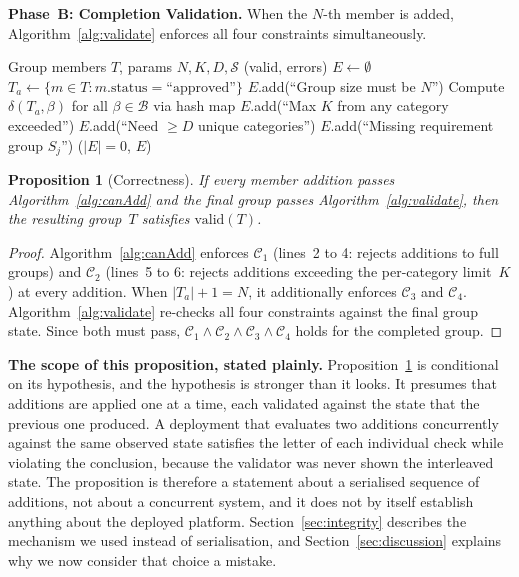 \documentclass[11pt,a4paper]{article}
\theoremstyle{plain}
\newtheorem{proposition}[theorem]{Proposition}
\theoremstyle{definition}
\theoremstyle{remark}
\begin{document}
\textbf{Phase~B: Completion Validation.} When the $N$-th member is added, Algorithm~\ref{alg:validate} enforces all four constraints simultaneously.

\begin{algorithm}[htbp]
\caption{Full Group Composition Validation (\texttt{validateComposition})}
\label{alg:validate}
\small
\begin{algorithmic}[1]
\REQUIRE Group members $T$, params $N, K, D, \mathcal{S}$
\ENSURE (valid, errors)
\STATE $E \gets \emptyset$
\STATE $T_a \gets \{m \in T : m.\text{status} = \text{``approved''}\}$
    \STATE $E$.add(``Group size must be $N$'')
\ENDIF
\STATE Compute $\delta(T_a, \beta)$ for all $\beta \in \mathcal{B}$ via hash map
    \STATE $E$.add(``Max $K$ from any category exceeded'')
\ENDIF
{}
    \STATE $E$.add(``Need $\geq D$ unique categories'')
\ENDIF
{}
        \STATE $E$.add(``Missing requirement group $S_j$'')
    \ENDIF
\ENDFOR
\RETURN ($|E| = 0$, $E$)
\end{algorithmic}
\end{algorithm}

\begin{proposition}[Correctness]
\label{prop:correctness}
If every member addition passes Algorithm~\ref{alg:canAdd} and the final group passes Algorithm~\ref{alg:validate}, then the resulting group~$T$ satisfies $\text{valid}(T)$.
\end{proposition}

\begin{proof}
Algorithm~\ref{alg:canAdd} enforces $\mathcal{C}_1$ (lines~2 to 4: rejects additions to full groups) and $\mathcal{C}_2$ (lines~5 to 6: rejects additions exceeding the per-category limit~$K$) at every addition. When $|T_a| + 1 = N$, it additionally enforces $\mathcal{C}_3$ and $\mathcal{C}_4$. Algorithm~\ref{alg:validate} re-checks all four constraints against the final group state. Since both must pass, $\mathcal{C}_1 \wedge \mathcal{C}_2 \wedge \mathcal{C}_3 \wedge \mathcal{C}_4$ holds for the completed group.
\end{proof}

\noindent\textbf{The scope of this proposition, stated plainly.} Proposition~\ref{prop:correctness} is conditional on its hypothesis, and the hypothesis is stronger than it looks. It presumes that additions are applied one at a time, each validated against the state that the previous one produced. A deployment that evaluates two additions concurrently against the same observed state satisfies the letter of each individual check while violating the conclusion, because the validator was never shown the interleaved state. The proposition is therefore a statement about a serialised sequence of additions, not about a concurrent system, and it does not by itself establish anything about the deployed platform. Section~\ref{sec:integrity} describes the mechanism we used instead of serialisation, and Section~\ref{sec:discussion} explains why we now consider that choice a mistake.
\end{document}
